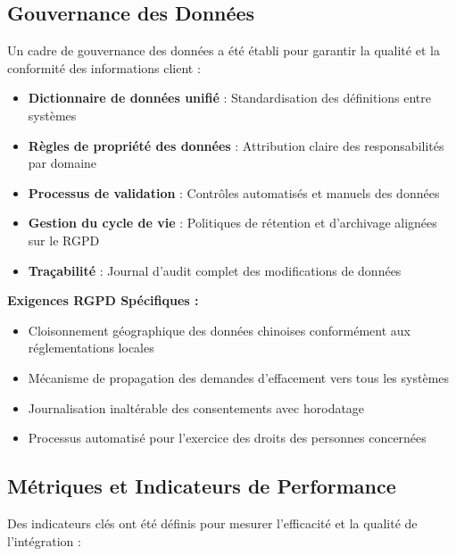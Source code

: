 \subsection{Gouvernance des Données}

Un cadre de gouvernance des données a été établi pour garantir la qualité et la conformité des informations client :

\begin{itemize}
    \item \textbf{Dictionnaire de données unifié} : Standardisation des définitions entre systèmes
    \item \textbf{Règles de propriété des données} : Attribution claire des responsabilités par domaine
    \item \textbf{Processus de validation} : Contrôles automatisés et manuels des données
    \item \textbf{Gestion du cycle de vie} : Politiques de rétention et d'archivage alignées sur le RGPD
    \item \textbf{Traçabilité} : Journal d'audit complet des modifications de données
\end{itemize}

\begin{mdframed}[backgroundcolor=warningorange, linewidth=0pt, innerleftmargin=10pt, innerrightmargin=10pt]
\textbf{Exigences RGPD Spécifiques :}
\begin{itemize}
    \item Cloisonnement géographique des données chinoises conformément aux réglementations locales
    \item Mécanisme de propagation des demandes d'effacement vers tous les systèmes
    \item Journalisation inaltérable des consentements avec horodatage
    \item Processus automatisé pour l'exercice des droits des personnes concernées
\end{itemize}
\end{mdframed}

\subsection{Métriques et Indicateurs de Performance}

Des indicateurs clés ont été définis pour mesurer l'efficacité et la qualité de l'intégration :

